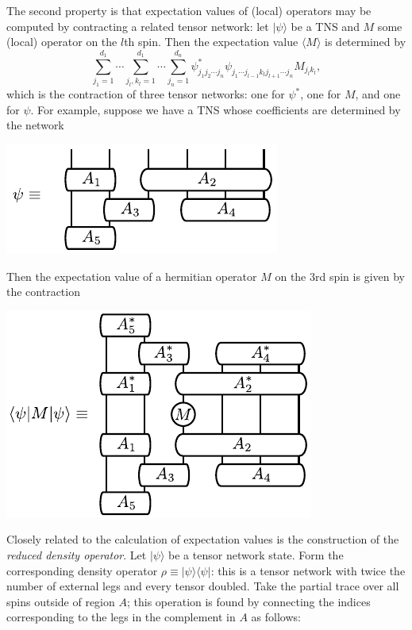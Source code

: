 \documentclass[twocolumn,lengthcheck,superscriptaddress]{revtex4-1}
\theoremstyle{definition}
\theoremstyle{remark}
\begin{document}
The second property is that expectation values of (local) operators may be computed by contracting a related tensor network: let $|\psi\rangle$ be a TNS and $M$ some (local) operator on the $l$th spin. Then the expectation value $\langle M \rangle$ is determined by
\begin{equation}
	 \sum_{j_1 = 1}^{d_1}\cdots\sum_{j_l,k_l = 1}^{d_1} \cdots \sum_{j_{n} = 1}^{d_{n} } \psi^*_{j_1j_2 \cdots j_{n}}\psi_{j_1 \cdots j_{l-1}k_l j_{l+1} \cdots j_{n}} M_{j_lk_l},
\end{equation}
which is the contraction of three tensor networks: one for $\psi^*$, one for $M$, and one for $\psi$.
For example, suppose we have a TNS whose coefficients are determined by the network
\begin{center}
\includegraphics{psinw.pdf}
\end{center}
Then the expectation value of a hermitian operator $M$ on the 3rd spin is given by the contraction
\begin{center}
\includegraphics{expvals.pdf}
\end{center}
Closely related to the calculation of expectation values is the construction of the \emph{reduced density operator}. Let $|\psi\rangle$ be a tensor network state. Form the corresponding density operator $\rho \equiv |\psi\rangle\langle \psi|$: this is a tensor network with twice the number of external legs and every tensor doubled. Take the partial trace over all spins outside of region $A$; this operation is found by connecting the indices corresponding to the legs in the complement in $A$ as follows:
\end{document}
